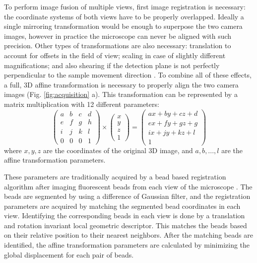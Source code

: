 To perform image fusion of multiple views, first image registration is necessary: the coordinate systems of both views have to be properly overlapped. Ideally a single mirroring transformation would be enough to superpose the two camera images, however in practice the microscope can never be aligned with such precision. Other types of transformations are also necessary: translation to account for offsets in the field of view; scaling in case of slightly different magnifications; and also shearing if the detection plane is not perfectly perpendicular to the sample movement direction \cite{krzic_multiple-view_2009}. To combine all of these effects, a full, 3D affine transformation is necessary to properly align the two camera images (Fig. \ref{fig:acquisition} a). This transformation can be represented by a matrix multiplication with 12 different parameters:
\[
\begin{pmatrix}
a & b & c & d \\ 
e & f & g & h \\ 
i & j & k & l \\
0 & 0 & 0 & 1 
\end{pmatrix}
\times
\begin{pmatrix}
x\\
y\\
z\\
1
\end{pmatrix}
=
\begin{pmatrix}
a x + b y + c z + d\\ 
e x + f y + g z + g\\ 
i x + j y + k z + l\\
1
\end{pmatrix}
\]
where $x, y, z$ are the coordinates of the original 3D image, and $a, b, ..., l$ are the affine transformation parameters.

These parameters are traditionally acquired by a bead based registration algorithm after imaging fluorescent beads from each view of the microscope \cite{preibisch_bead-based_2009,preibisch_software_2010}. The beads are segmented by using a difference of Gaussian filter, and the registration parameters are acquired by matching the segmented bead coordinates in each view. Identifying the corresponding beads in each view is done by a translation and rotation invariant local geometric descriptor. This matches the beads based on their relative position to their nearest neighbors. After the matching beads are identified, the affine transformation parameters are calculated by minimizing the global displacement for each pair of beads.

